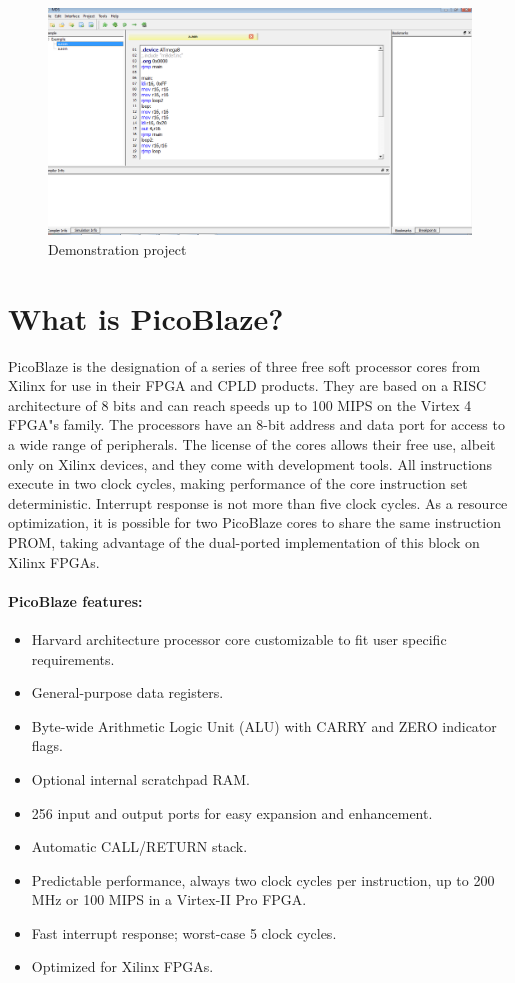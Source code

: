     \begin{figure}[h]
        \centering{}
        \includegraphics[width=.5\textwidth]{img/Demonstration_project.png}
        \caption{Demonstration project}
    \end{figure}

\section{What is PicoBlaze?}
    PicoBlaze is the designation of a series of three free soft processor cores from Xilinx for use in their FPGA and CPLD products. They are based on a RISC architecture of 8 bits and can reach speeds up to 100 MIPS on the Virtex 4 FPGA"s family. The processors have an 8-bit address and data port for access to a wide range of peripherals. The license of the cores allows their free use, albeit only on Xilinx devices, and they come with development tools. All instructions execute in two clock cycles, making performance of the core instruction set deterministic. Interrupt response is not more than five clock cycles. As a resource optimization, it is possible for two PicoBlaze cores to share the same instruction PROM, taking advantage of the dual-ported implementation of this block on Xilinx FPGAs.

    \paragraph{PicoBlaze features:}
        \begin{itemize}
            \item Harvard architecture processor core customizable to fit user specific requirements.
            \item General-purpose data registers.
            \item Byte-wide Arithmetic Logic Unit (ALU) with CARRY and ZERO indicator flags.
            \item Optional internal scratchpad RAM.
            \item 256 input and output ports for easy expansion and enhancement.
            \item Automatic CALL/RETURN stack.
            \item Predictable performance, always two clock cycles per instruction, up to 200 MHz or 100 MIPS in a Virtex-II Pro FPGA.
            \item Fast interrupt response; worst-case 5 clock cycles.
            \item Optimized for Xilinx FPGAs.
        \end{itemize}
